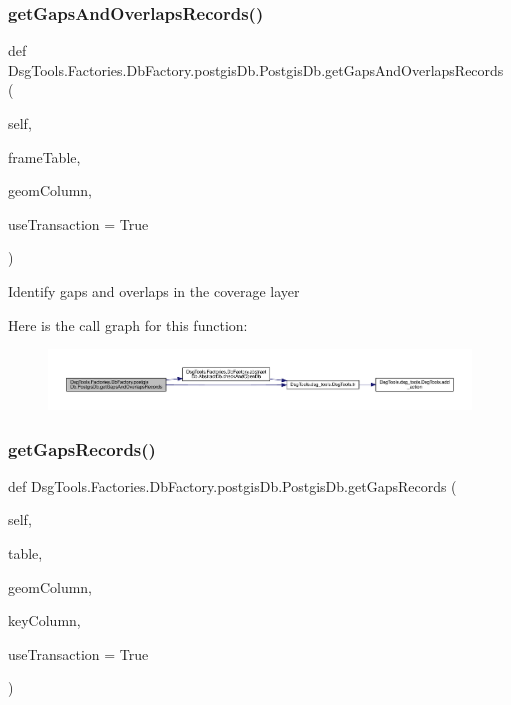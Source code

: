 \subsubsection{\texorpdfstring{get\+Gaps\+And\+Overlaps\+Records()}{getGapsAndOverlapsRecords()}}
{\footnotesize\ttfamily def Dsg\+Tools.\+Factories.\+Db\+Factory.\+postgis\+Db.\+Postgis\+Db.\+get\+Gaps\+And\+Overlaps\+Records (\begin{DoxyParamCaption}\item[{}]{self,  }\item[{}]{frame\+Table,  }\item[{}]{geom\+Column,  }\item[{}]{use\+Transaction = {\ttfamily True} }\end{DoxyParamCaption})}

\begin{DoxyVerb}Identify gaps and overlaps in the coverage layer
\end{DoxyVerb}
 Here is the call graph for this function\+:
\nopagebreak
\begin{figure}[H]
\begin{center}
\leavevmode
\includegraphics[width=350pt]{class_dsg_tools_1_1_factories_1_1_db_factory_1_1postgis_db_1_1_postgis_db_a2d6da09a9c52e785bef17b0e9c2d7d32_cgraph}
\end{center}
\end{figure}
\mbox{\label{class_dsg_tools_1_1_factories_1_1_db_factory_1_1postgis_db_1_1_postgis_db_a650039fe21c0c2ecf52984150a7e12e8}} 
\subsubsection{\texorpdfstring{get\+Gaps\+Records()}{getGapsRecords()}}
{\footnotesize\ttfamily def Dsg\+Tools.\+Factories.\+Db\+Factory.\+postgis\+Db.\+Postgis\+Db.\+get\+Gaps\+Records (\begin{DoxyParamCaption}\item[{}]{self,  }\item[{}]{table,  }\item[{}]{geom\+Column,  }\item[{}]{key\+Column,  }\item[{}]{use\+Transaction = {\ttfamily True} }\end{DoxyParamCaption})}

